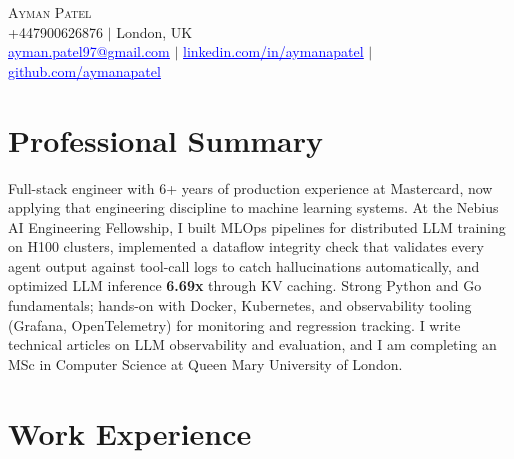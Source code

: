 \documentclass[letterpaper,11pt]{article}
\newcommand{\headerLink}[2]{\href{#1}{\textcolor{blue}{\underline{#2}}}}
\begin{document}
    \begin{center}
        {\Huge\scshape Ayman Patel}
        \\ +447900626876 $|$ London, UK\\
        \small
        \headerLink{mailto:ayman.patel97@gmail.com}{ayman.patel97@gmail.com} $|$
        \headerLink{https://linkedin.com/in/aymanapatel}{linkedin.com/in/aymanapatel} $|$
        \headerLink{https://github.com/aymanapatel}{github.com/aymanapatel}
    \end{center}

\section{Professional Summary}
\small{
Full-stack engineer with 6+ years of production experience at Mastercard, now applying that engineering discipline to machine learning systems. At the Nebius AI Engineering Fellowship, I built MLOps pipelines for distributed LLM training on H100 clusters, implemented a dataflow integrity check that validates every agent output against tool-call logs to catch hallucinations automatically, and optimized LLM inference \textbf{6.69x} through KV caching. Strong Python and Go fundamentals; hands-on with Docker, Kubernetes, and observability tooling (Grafana, OpenTelemetry) for monitoring and regression tracking. I write technical articles on LLM observability and evaluation, and I am completing an MSc in Computer Science at Queen Mary University of London.
}
\vspace{0pt}



\section{Work Experience}
\end{document}
